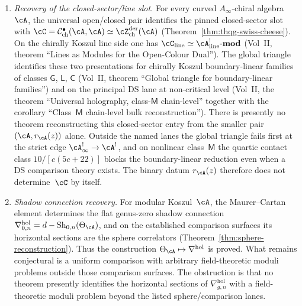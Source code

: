 \begin{proposition}
\begin{enumerate}[label=\textup{(\roman*)}]
$L_{-1/2}(\mathfrak{sl}_2)$ class $\eta_4$ is the concrete witness.
\item \emph{Recovery of the closed-sector/line slot.}
 For every curved $A_\infty$-chiral algebra~$\cA$, the universal
 open/closed pair identifies the pinned closed-sector slot with
 $\cC=\mathcal{C}^{\bullet}_{\mathrm{ch}}(\cA,\cA)
 \simeq \cZ^{\mathrm{der}}_{\mathrm{ch}}(\cA)$
 \textup{(}Theorem~\ref{thm:thqg-swiss-cheese}\textup{)}.
 On the chirally Koszul line side one has
 $\cC_{\mathrm{line}} \simeq
 \cA^!_{\mathrm{line}}\text{-}\mathbf{mod}$
 \textup{(}Vol~II, theorem ``Lines as Modules for the Open-Colour
 Dual''\textup{)}.
 The global triangle identifies these two presentations for
 chirally Koszul boundary-linear families of classes
 $\mathsf{G}$, $\mathsf{L}$, $\mathsf{C}$
 \textup{(}Vol~II, theorem ``Global triangle for boundary-linear
 families''\textup{)} and on
 the principal DS lane at non-critical level
 \textup{(}Vol~II, the theorem ``Universal holography,
 class-$\mathsf{M}$ chain-level'' together with the corollary
 ``Class~$\mathsf{M}$ chain-level bulk reconstruction''\textup{)}.
 There is presently no theorem reconstructing this closed-sector entry from the
 smaller pair~$(\cA,r_\cA(z))$ alone. Outside the named lanes the
 global triangle fails first at the strict edge
 $\cA^{!}_\infty\to\cA^!$, and on nonlinear class~$\mathsf{M}$ the
 quartic contact class $10/[c(5c+22)]$ blocks the boundary-linear
 reduction even when a DS comparison theory exists. The binary datum
 $r_\cA(z)$ therefore does not determine~$\cC$ by itself.
\item \emph{Shadow connection recovery.}
 For modular Koszul~$\cA$, the Maurer--Cartan element determines the
 flat genus-zero shadow connection
 $\nabla^{\mathrm{hol}}_{0,n}=d-\operatorname{Sh}_{0,n}(\Theta_\cA)$,
 and on the established comparison surfaces its horizontal sections are
 the sphere correlators
 \textup{(}Theorem~\ref{thm:sphere-reconstruction}\textup{)}.
 Thus the construction
 $\Theta_\cA \mapsto \nabla^{\mathrm{hol}}$ is proved. What remains
 conjectural is a uniform comparison with arbitrary field-theoretic
 moduli problems outside those comparison surfaces. The obstruction is
 that no theorem presently identifies the horizontal sections of
 $\nabla^{\mathrm{hol}}_{g,n}$ with a field-theoretic moduli problem
 beyond the listed sphere/comparison lanes.
\end{enumerate}
\end{proposition}

